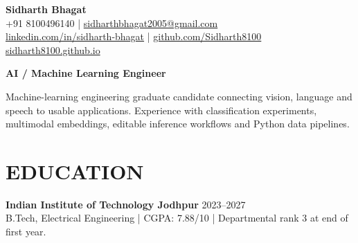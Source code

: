 \documentclass[10pt,a4paper]{article}
\begin{document}
\fontsize{9}{12.2}\selectfont
\begin{center}
{\fontsize{23}{26}\selectfont\bfseries Sidharth Bhagat}\\[4pt]
+91 8100496140 | \href{mailto:sidharthbhagat2005@gmail.com}{sidharthbhagat2005@gmail.com}\\
\href{https://www.linkedin.com/in/sidharth-bhagat/}{linkedin.com/in/sidharth-bhagat} | \href{https://github.com/Sidharth8100}{github.com/Sidharth8100}\\
\href{https://sidharth8100.github.io}{sidharth8100.github.io}
\end{center}
\textbf{AI / Machine Learning Engineer}\par
Machine-learning engineering graduate candidate connecting vision, language and speech to usable applications. Experience with classification experiments, multimodal embeddings, editable inference workflows and Python data pipelines.
\section*{EDUCATION}
\textbf{Indian Institute of Technology Jodhpur} \hfill 2023--2027\\
B.Tech, Electrical Engineering | CGPA: 7.88/10 | Departmental rank 3 at end of first year.
\end{document}
